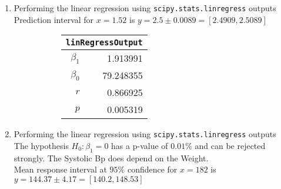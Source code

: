 \begin{enumerate}
\begin{enumerate}
\end{enumerate}

\item Performing the linear regression using \texttt{scipy.stats.linregress} outputs \\
Prediction interval for $ x = 1.52 $ is $ y = 2.5 \pm 0.0089 = [2.4909, 2.5089] $\\


\begin{figure}[H]
	\begin{subfigure}[]{0.2\linewidth}
		\centering
		\begin{tabular}{@{}rr@{}}
			\toprule
			\multicolumn{2}{c}{\texttt{linRegressOutput}} \\
			\midrule
			$\beta_1$     &         1.913991 \\
			$\beta_0$ &        79.248355 \\
			$r$    &         0.866925 \\
			$p$    &         0.005319 \\
			\bottomrule
		\end{tabular}
		
	\end{subfigure}
	\begin{subfigure}[]{0.8\linewidth}
		\centering
		
	\end{subfigure}
\end{figure}

\item Performing the linear regression using \texttt{scipy.stats.linregress} outputs \\
The hypothesis $ H_0 : \beta_1 = 0 $ has a p-value of $ 0.01\% $ and can be rejected strongly. The Systolic Bp does depend on the Weight.\\
Mean response interval at $ 95\% $ confidence for $ x = 182 $ is $ y = 144.37 \pm 4.17 = [140.2, 148.53] $\\


\end{enumerate}
